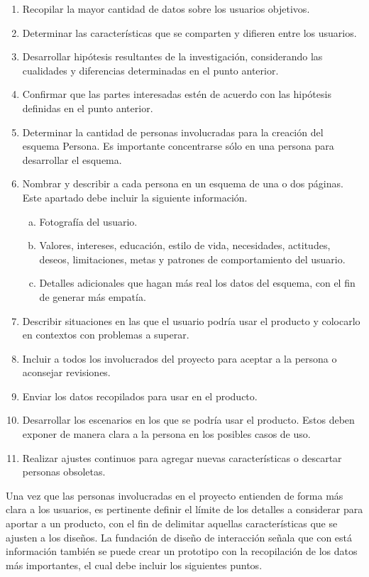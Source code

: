 \begin{enumerate}
  \item Recopilar la mayor cantidad de datos sobre los usuarios objetivos.
  \item Determinar las características que se comparten y difieren entre los usuarios.
  \item Desarrollar hipótesis resultantes de la investigación, considerando las cualidades y diferencias determinadas en el punto anterior.
  \item Confirmar que las partes interesadas estén de acuerdo con las hipótesis definidas en el punto anterior.
  \item Determinar la cantidad de personas involucradas para la creación del esquema Persona. Es importante concentrarse sólo en una persona para desarrollar el esquema.
  \item Nombrar y describir a cada persona en un esquema de una o dos páginas. Este apartado debe incluir la siguiente información.
  \begin{enumerate}[a)]
    \item Fotografía del usuario.
    \item Valores, intereses, educación, estilo de vida, necesidades, actitudes, deseos, limitaciones, metas y patrones de comportamiento del usuario.
    \item Detalles adicionales que hagan más real los datos del esquema, con el fin de generar más empatía.
  \end{enumerate}
  \item Describir situaciones en las que el usuario podría usar el producto y colocarlo en contextos con problemas a superar.
  \item Incluir a todos los involucrados del proyecto para aceptar a la persona o aconsejar revisiones.
  \item Enviar los datos recopilados para usar en el producto.
  \item Desarrollar los escenarios en los que se podría usar el producto. Estos deben exponer de manera clara a la persona en los posibles casos de uso.
  \item Realizar ajustes continuos para agregar nuevas características o descartar personas obsoletas.
\end{enumerate}

Una vez que las personas involucradas en el proyecto entienden de forma más clara a los usuarios, es pertinente definir el límite de los detalles a considerar para aportar a un producto, con el fin de delimitar aquellas características que se ajusten a los diseños. La fundación de diseño de interacción señala que con está información también se puede crear un prototipo con la recopilación de los datos más importantes, el cual debe incluir los siguientes puntos.

